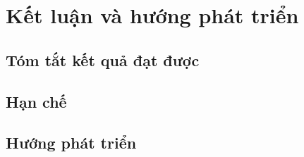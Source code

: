 \chapter{Kết luận và hướng phát triển}
\label{chap:ketluan}


\section{Tóm tắt kết quả đạt được}

\section{Hạn chế}

\section{Hướng phát triển}
